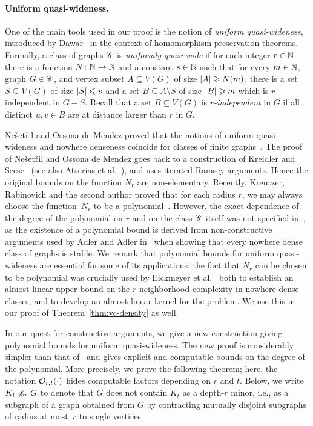 \paragraph{Uniform quasi-wideness.}
One of the main tools used in our proof 
is the notion of \emph{uniform quasi-wideness},
introduced by Dawar~\cite{dawar2010homomorphism}
in the context of homomorphism preservation theorems.
%
Formally, a class of graphs $\mathscr{C}$  is \emph{uniformly quasi-wide} if for each integer $r\in\mathbb{N}$ there is a function
 $N\colon \mathbb{N}\rightarrow \mathbb{N}$ and a constant  $s\in \mathbb{N}$ such
that for every $m\in \mathbb{N}$, graph $G\in \mathscr{C}$, and vertex subset $A\subseteq V(G)$ of size $\left\lvert A\right\rvert\geqslant N(m)$,
there is a set $S\subseteq V(G)$ of size $\left\lvert S\right\rvert\leqslant s$ and a set
$B\subseteq A\setminus S$ of size $\left\lvert B\right\rvert\geqslant m$ which is $r$-independent in
$G-S$. Recall that a set $B\subseteq V(G)$ is {\em{$r$-independent}} in $G$ if all
distinct $u,v\in B$ are at distance 
larger than $r$ in $G$.

Ne\v{s}et\v{r}il and Ossona de Mendez proved that
the notions of uniform quasi-wideness and nowhere denseness coincide for 
classes of finite graphs~\cite{nevsetvril2010first}. 
The proof of Ne\v{s}et\v{r}il 
and Ossona de Mendez goes back to a construction
of Kreidler and Seese~\cite{kreidler1998monadic} (see also Atserias et al.~\cite{atserias2006preservation}), 
and uses iterated Ramsey arguments. Hence the original bounds on 
the function $N_r$ are non-elementary. Recently, Kreutzer, Rabinovich and the second author
 proved that for each radius $r$, we may always choose the function~$N_r$ to be a polynomial~\cite{siebertz2016polynomial}. 
 However, the exact 
 dependence of the degree of the polynomial on $r$ and on the class $\mathscr{C}$ itself
 was not specified in~\cite{siebertz2016polynomial}, as the existence of a polynomial bound is derived
from non-constructive arguments used by Adler and Adler in~\cite{adler2014interpreting} when showing that every nowhere dense class of graphs
is stable. We remark that polynomial bounds for uniform quasi-wideness are essential for some of its applications:
the fact that $N_r$ can be chosen to be polynomial was crucially used by Eickmeyer et al.~\cite{eickmeyer2016neighborhood} both to establish an almost linear upper bound on the
$r$-neighborhood complexity in nowhere dense classes, and to develop an almost linear kernel for the {} problem.
We use this %
in our proof of Theorem~\ref{thm:vc-density} as well.

In our quest for constructive arguments, we give a new construction giving polynomial bounds for uniform quasi-wideness.
The new proof is considerably simpler than that of~\cite{siebertz2016polynomial}
and gives explicit and computable bounds on the degree of the polynomial.
More precisely, we prove the following theorem; here, the notation $\mathcal{O}_{r,t}(\cdot)$ hides computable factors depending on $r$ and $t$.
Below, we write $K_t\not\preccurlyeq_r G$ to denote that $G$ does not 
contain $K_t$ as a depth-$r$ minor, i.e., as a subgraph of a graph 
obtained from $G$ by contracting mutually disjoint  subgraphs of 
radius at most~$r$ to single vertices.

